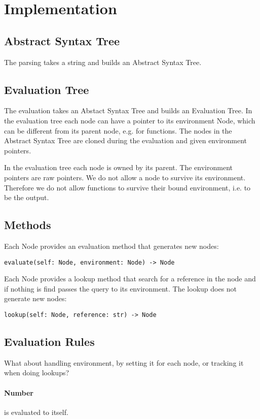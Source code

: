 \documentclass[a4paper,12pt]{article}
\begin{document}
\section{Implementation}

\subsection{Abstract Syntax Tree}
The parsing takes a string and builds an Abstract Syntax Tree.

\subsection{Evaluation Tree}

The evaluation takes an Abstact Syntax Tree and builds an Evaluation Tree. In the evaluation tree each node can have a pointer to its environment Node, which can be different from its parent node, e.g. for functions. The nodes in the Abstract Syntax Tree are cloned during the evaluation and given environment pointers.

In the evaluation tree each node is owned by its parent. The environment pointers are raw pointers. We do not allow a node to survive its environment. Therefore we do not allow functions to survive their bound environment, i.e. to be the output.

\subsection{Methods}

Each Node provides an evaluation method that generates new nodes:
\begin{verbatim}
evaluate(self: Node, environment: Node) -> Node
\end{verbatim}
Each Node provides a lookup method that search for a reference in the node and if nothing is find passes the query to its environment. The lookup does not generate new nodes:
\begin{verbatim}
lookup(self: Node, reference: str) -> Node
\end{verbatim}

\subsection{Evaluation Rules}
What about handling environment, by setting it for each node, or tracking it when doing lookups?

\paragraph{Number} is evaluated to itself.
\end{document}
